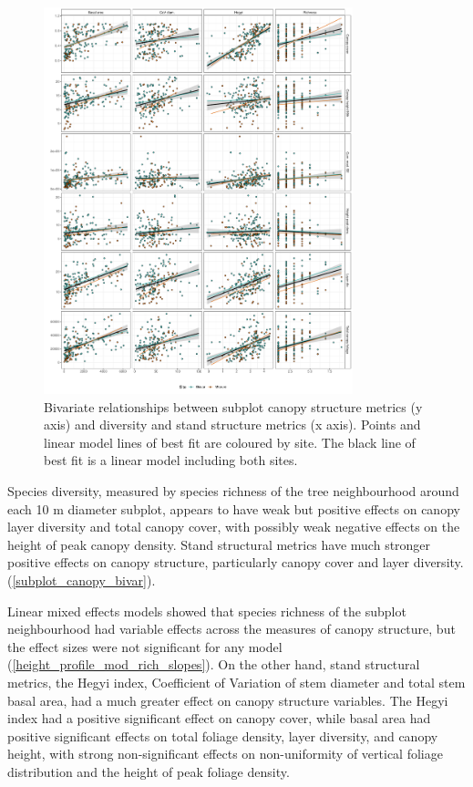 \documentclass[11pt,a4paper]{article}
\begin{document}
\begin{figure}[H]
\centering
	\includegraphics[width=0.8\textwidth]{subplot_canopy_bivar}
	\caption{Bivariate relationships between subplot canopy structure metrics (y axis) and diversity and stand structure metrics (x axis). Points and linear model lines of best fit are coloured by site. The black line of best fit is a linear model including both sites.}
	\label{subplot_canopy_bivar}
\end{figure}

Species diversity, measured by species richness of the tree neighbourhood around each 10 m diameter subplot, appears to have weak but positive effects on canopy layer diversity and total canopy cover, with possibly weak negative effects on the height of peak canopy density. Stand structural metrics have much stronger positive effects on canopy structure, particularly canopy cover and layer diversity. (\autoref{subplot_canopy_bivar}).

Linear mixed effects models showed that species richness of the subplot neighbourhood had variable effects across the measures of canopy structure, but the effect sizes were not significant for any model (\autoref{height_profile_mod_rich_slopes}). On the other hand, stand structural metrics, the Hegyi index, Coefficient of Variation of stem diameter and total stem basal area, had a much greater effect on canopy structure variables. The Hegyi index had a positive significant effect on canopy cover, while basal area had positive significant effects on total foliage density, layer diversity, and canopy height, with strong non-significant effects on non-uniformity of vertical foliage distribution and the height of peak foliage density.
\end{document}

